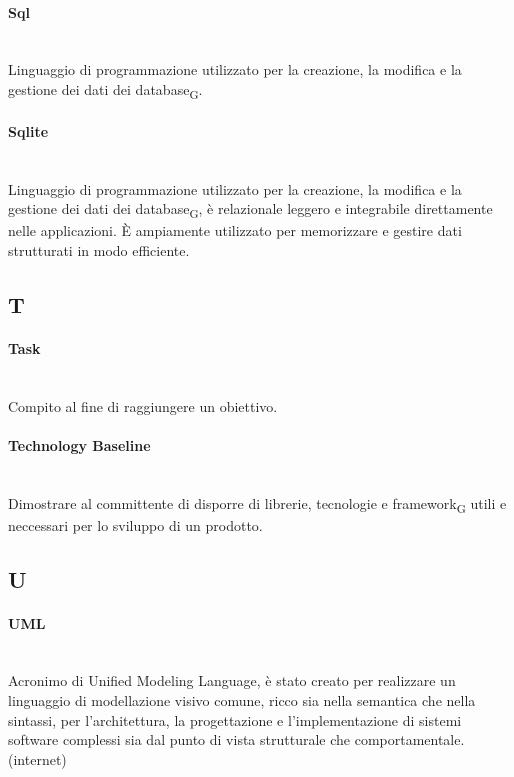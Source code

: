 \paragraph{Sql}~\smallskip \\
Linguaggio di programmazione utilizzato per la creazione, la modifica e la gestione dei dati dei database\textsubscript{G}.

\paragraph{Sqlite}~\smallskip \\
Linguaggio di programmazione utilizzato per la creazione, la modifica e la gestione dei dati dei database\textsubscript{G}, è relazionale leggero e integrabile direttamente nelle applicazioni. È ampiamente utilizzato per memorizzare e gestire dati strutturati in modo efficiente.

\newpage
{}
\subsection*{T}
\paragraph{Task}~\smallskip \\
Compito al fine di raggiungere un obiettivo.

\paragraph{Technology Baseline}~\smallskip \\
Dimostrare al committente di disporre di librerie, tecnologie e framework\textsubscript{G} utili e neccessari per lo sviluppo di un prodotto.

\newpage
{}
\subsection*{U}
\paragraph{UML}~\smallskip \\
Acronimo di Unified Modeling Language, è stato creato per realizzare un linguaggio di modellazione visivo comune, ricco 
sia nella semantica che nella sintassi, per l'architettura, la progettazione e l'implementazione di sistemi 
software complessi sia dal punto di vista strutturale che comportamentale. (internet)

